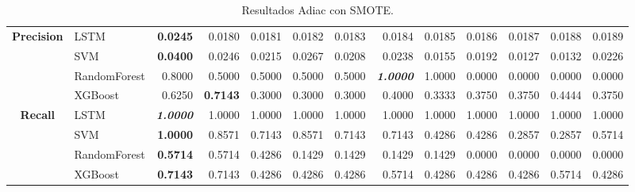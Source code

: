 \begin{table}[H]
\begin{adjustbox}{max width=14cm}
\begin{tabular}{|c|l|r|r|r|r|r|r|r|r|r|r|r|}
			\hline
			\textbf{Precision} &  LSTM & \textbf{  0.0245 } &  0.0180 &  0.0181 &  0.0182 &  0.0183 &  0.0184 &  0.0185 &  0.0186 &  0.0187 &  0.0188 &  0.0189 \\
			&  SVM & \textbf{  0.0400 } &  0.0246 &  0.0215 &  0.0267 &  0.0208 &  0.0238 &  0.0155 &  0.0192 &  0.0127 &  0.0132 &  0.0226 \\
			&  RandomForest &  0.8000 &  0.5000 &  0.5000 &  0.5000 &  0.5000 & \textit{ \textbf{  1.0000 } } &  1.0000 &  0.0000 &  0.0000 &  0.0000 &  0.0000 \\
			&  XGBoost &  0.6250 & \textbf{  0.7143 } &  0.3000 &  0.3000 &  0.3000 &  0.4000 &  0.3333 &  0.3750 &  0.3750 &  0.4444 &  0.3750 \\
			\hline
			\textbf{Recall} &  LSTM & \textit{ \textbf{  1.0000 } } &  1.0000 &  1.0000 &  1.0000 &  1.0000 &  1.0000 &  1.0000 &  1.0000 &  1.0000 &  1.0000 &  1.0000 \\
			&  SVM & \textbf{  1.0000 } &  0.8571 &  0.7143 &  0.8571 &  0.7143 &  0.7143 &  0.4286 &  0.4286 &  0.2857 &  0.2857 &  0.5714 \\
			&  RandomForest & \textbf{  0.5714 } &  0.5714 &  0.4286 &  0.1429 &  0.1429 &  0.1429 &  0.1429 &  0.0000 &  0.0000 &  0.0000 &  0.0000 \\
			&  XGBoost & \textbf{  0.7143 } &  0.7143 &  0.4286 &  0.4286 &  0.4286 &  0.5714 &  0.4286 &  0.4286 &  0.4286 &  0.5714 &  0.4286 \\
			\hline
		\end{tabular}
	\end{adjustbox}
	\caption{Resultados Adiac con SMOTE.}
	\label{tab:Adiac_SMOTE}
\end{table}
